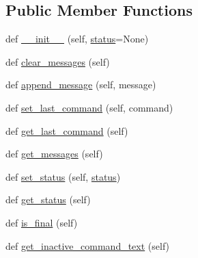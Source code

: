 \subsection*{Public Member Functions}
\begin{DoxyCompactItemize}
\item 
def \hyperlink{classparlai_1_1mturk_1_1core_1_1legacy__2018_1_1agents_1_1AssignState_a9451ae6465429d1cd27e208fd3f852bf}{\+\_\+\+\_\+init\+\_\+\+\_\+} (self, \hyperlink{classparlai_1_1mturk_1_1core_1_1legacy__2018_1_1agents_1_1AssignState_a256124e49cab161d21001e45e26a391a}{status}=None)
\item 
def \hyperlink{classparlai_1_1mturk_1_1core_1_1legacy__2018_1_1agents_1_1AssignState_aef53107e3d4aa840b7fcca32ef393bf3}{clear\+\_\+messages} (self)
\item 
def \hyperlink{classparlai_1_1mturk_1_1core_1_1legacy__2018_1_1agents_1_1AssignState_af36e4b00767bbb4459ce87fe95b17672}{append\+\_\+message} (self, message)
\item 
def \hyperlink{classparlai_1_1mturk_1_1core_1_1legacy__2018_1_1agents_1_1AssignState_a2aae5b36e3da9791dbb1c5677aa5e24d}{set\+\_\+last\+\_\+command} (self, command)
\item 
def \hyperlink{classparlai_1_1mturk_1_1core_1_1legacy__2018_1_1agents_1_1AssignState_aa578343eefce8c86ab64ab06430f864b}{get\+\_\+last\+\_\+command} (self)
\item 
def \hyperlink{classparlai_1_1mturk_1_1core_1_1legacy__2018_1_1agents_1_1AssignState_a3b76b7bf814eb404117013bed706504d}{get\+\_\+messages} (self)
\item 
def \hyperlink{classparlai_1_1mturk_1_1core_1_1legacy__2018_1_1agents_1_1AssignState_a27ffbfa35ca00b8db0d0062aa476a65c}{set\+\_\+status} (self, \hyperlink{classparlai_1_1mturk_1_1core_1_1legacy__2018_1_1agents_1_1AssignState_a256124e49cab161d21001e45e26a391a}{status})
\item 
def \hyperlink{classparlai_1_1mturk_1_1core_1_1legacy__2018_1_1agents_1_1AssignState_aa06c7d109d7b208a9dcdef0d3fa6c90f}{get\+\_\+status} (self)
\item 
def \hyperlink{classparlai_1_1mturk_1_1core_1_1legacy__2018_1_1agents_1_1AssignState_ac1c93e39da15b6daee60058af9d2f04a}{is\+\_\+final} (self)
\item 
def \hyperlink{classparlai_1_1mturk_1_1core_1_1legacy__2018_1_1agents_1_1AssignState_a68d951e5683ae7b37acbbadbd8f74afa}{get\+\_\+inactive\+\_\+command\+\_\+text} (self)
\end{DoxyCompactItemize}

